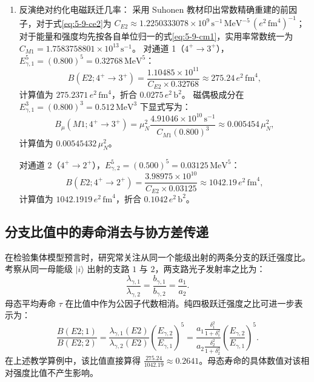 \begin{enumerate}
\item 反演绝对约化电磁跃迁几率：
采用 Suhonen 教材印出常数精确重建的前因子，对于式\eqref{eq:5-9-ce2}为 $C_{E2} \approx 1.2250333078 \times 10^9\,\text{s}^{-1}\,\text{MeV}^{-5}\,(e^2\,\text{fm}^4)^{-1}$；对于能量和强度均先按各自单位归一的式\eqref{eq:5-9-cm1}，实用率常数统一为 $C_{M1} = 1.7583758801 \times 10^{13}\,\text{s}^{-1}$。
对通道 1（$4^+ \to 3^+$），$E_{\gamma, 1}^5 = (0.800)^5 = 0.32768\,\text{MeV}^5$：
\begin{equation}\label{eq:5-9-ped-be2-1}
B(E2; 4^+ \to 3^+) = \frac{1.10485 \times 10^{11}}{C_{E2} \times 0.32768} \approx 275.24\,e^2\,\text{fm}^4,
\end{equation}
计算值为 $275.2371\,e^2\,\text{fm}^4$，折合 $0.0275\,e^2\,\text{b}^2$。
磁偶极成分在 $E_{\gamma, 1}^3 = (0.800)^3 = 0.512\,\text{MeV}^3$ 下显式写为：
\begin{equation}\label{eq:5-9-ped-bm1-1}
B_\mu(M1; 4^+ \to 3^+) = \mu_N^2 \frac{4.91046 \times 10^{10}\,\text{s}^{-1}}{C_{M1} (0.800)^3} \approx 0.005454\,\mu_N^2,
\end{equation}
计算值为 $0.00545432\,\mu_N^2$。

对通道 2（$4^+ \to 2^+$），$E_{\gamma, 2}^5 = (0.500)^5 = 0.03125\,\text{MeV}^5$：
\begin{equation}\label{eq:5-9-ped-be2-2}
B(E2; 4^+ \to 2^+) = \frac{3.98975 \times 10^{10}}{C_{E2} \times 0.03125} \approx 1042.19\,e^2\,\text{fm}^4,
\end{equation}
计算值为 $1042.1919\,e^2\,\text{fm}^4$，折合 $0.1042\,e^2\,\text{b}^2$。
\end{enumerate}

\subsection{分支比值中的寿命消去与协方差传递}\label{subsec:5-9-6}

在检验集体模型预言时，研究常关注从同一个能级出射的两条分支的跃迁强度比。考察从同一母能级 $|i\rangle$ 出射的支路 $1$ 与 $2$，两支路光子发射率之比为：
\begin{equation}\label{eq:5-9-ratio-branch}
\frac{\lambda_{\gamma, 1}}{\lambda_{\gamma, 2}} = \frac{b_{\gamma, 1}}{b_{\gamma, 2}} = \frac{a_1}{a_2}.
\end{equation}
母态平均寿命 $\tau$ 在比值中作为公因子代数相消。纯四极跃迁强度之比可进一步表示为：
\begin{equation}\label{eq:5-9-ratio-be2}
\frac{B(E2; 1)}{B(E2; 2)} = \frac{\lambda_{\gamma, 1}(E2)}{\lambda_{\gamma, 2}(E2)} \left(\frac{E_{\gamma, 2}}{E_{\gamma, 1}}\right)^5 = \frac{a_1 \frac{\delta_1^2}{1 + \delta_1^2}}{a_2 \frac{\delta_2^2}{1 + \delta_2^2}} \left(\frac{E_{\gamma, 2}}{E_{\gamma, 1}}\right)^5.
\end{equation}
在上述教学算例中，该比值直接算得 $\frac{275.24}{1042.19} \approx 0.2641$。母态寿命的具体数值对该相对强度比值不产生影响。

